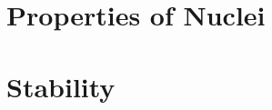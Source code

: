 \documentclass[../qm.tex]{subfiles}
\begin{document}
\section{Properties of Nuclei}
\section{Stability}
\end{document}

